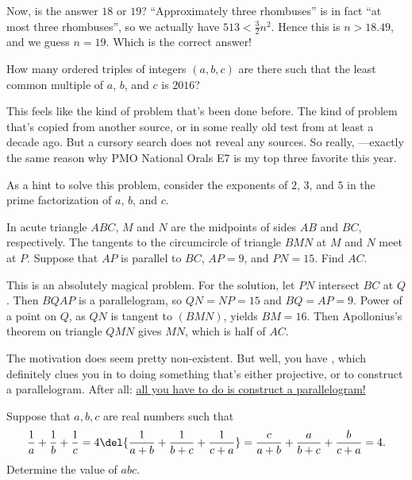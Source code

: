 \documentclass[11pt,paper=letter]{scrartcl}
\begin{document}
Now, is the answer $18$ or $19$? ``Approximately three rhombuses'' is in fact ``at most three rhombuses'', so we actually have $513 < \frac32n^2$. Hence this is $n > 18.49$, and we guess $n = 19$. Which is the correct answer!

\begin{probboxed}
   How many ordered triples of integers $(a, b, c)$ are there such that the least common multiple of $a$, $b$, and $c$ is $2016$?
\end{probboxed}

This feels like the kind of problem that's been done before. The kind of problem that's copied from another source, or in some really old test from at least a decade ago. But a cursory search does not reveal any sources. So really, ---exactly the same reason why PMO National Orals E7 is my top three favorite this year.

As a hint to solve this problem, consider the exponents of $2$, $3$, and $5$ in the prime factorization of $a$, $b$, and $c$.

\begin{probboxed}
   In acute triangle $ABC$, $M$ and $N$ are the midpoints of sides $AB$ and $BC$, respectively. The tangents to the circumcircle of triangle $BMN$ at $M$ and $N$ meet at $P$. Suppose that $AP$ is parallel to $BC$, $AP = 9$, and $PN = 15$. Find $AC$.
\end{probboxed}

This is an absolutely magical problem. For the solution, let $PN$ intersect $BC$ at $Q$. Then $BQAP$ is a parallelogram, so $QN = NP = 15$ and $BQ = AP = 9$. Power of a point on $Q$, as $QN$ is tangent to $(BMN)$, yields $BM = 16$. Then Apollonius's theorem on triangle $QMN$ gives $MN$, which is half of $AC$. 

The motivation does seem pretty non-existent. But well, you have , which definitely clues you in to doing something that's either projective, or to construct a parallelogram. After all: \href{http://web.evanchen.cc/handouts/BMC_Parallelograms/BMC_Parallelograms.pdf}{all you have to do is construct a parallelogram!}

\begin{probboxed}
   Suppose that $a, b, c$ are real numbers such that $$\frac1a + \frac1b + \frac1c = 4\del{\frac1{a+b} + \frac1{b+c} + \frac1{c+a}} = \frac c{a+b} + \frac a{b+c} + \frac b{c+a} = 4.$$ Determine the value of $abc$.
\end{probboxed}
\end{document}
